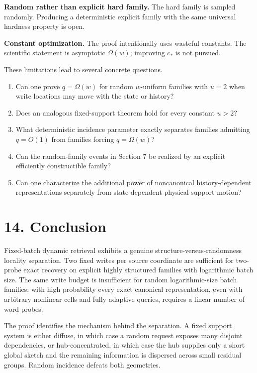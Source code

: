 \documentclass[
]{article}
\providecommand{\tightlist}{%
  \setlength{\itemsep}{0pt}\setlength{\parskip}{0pt}}
\begin{document}
\textbf{Random rather than explicit hard family.} The hard family is
sampled randomly. Producing a deterministic explicit family with the
same universal hardness property is open.

\textbf{Constant optimization.} The proof intentionally uses wasteful
constants. The scientific statement is asymptotic \(\Omega(w)\);
improving \(c_*\) is not pursued.

These limitations lead to several concrete questions.

\begin{enumerate}
\def\labelenumi{\arabic{enumi}.}
\tightlist
\item
  Can one prove \(q=\Omega(w)\) for random \(w\)-uniform families with
  \(u=2\) when write locations may move with the state or history?
\item
  Does an analogous fixed-support theorem hold for every constant
  \(u>2\)?
\item
  What deterministic incidence parameter exactly separates families
  admitting \(q=O(1)\) from families forcing \(q=\Omega(w)\)?
\item
  Can the random-family events in Section 7 be realized by an explicit
  efficiently constructible family?
\item
  Can one characterize the additional power of noncanonical
  history-dependent representations separately from state-dependent
  physical support motion?
\end{enumerate}

\hypertarget{conclusion}{%
\section{14. Conclusion}\label{conclusion}}

Fixed-batch dynamic retrieval exhibits a genuine
structure-versus-randomness locality separation. Two fixed writes per
source coordinate are sufficient for two-probe exact recovery on
explicit highly structured families with logarithmic batch size. The
same write budget is insufficient for random logarithmic-size batch
families: with high probability every exact canonical representation,
even with arbitrary nonlinear cells and fully adaptive queries, requires
a linear number of word probes.

The proof identifies the mechanism behind the separation. A fixed
support system is either diffuse, in which case a random request exposes
many disjoint dependencies, or hub-concentrated, in which case the hub
supplies only a short global sketch and the remaining information is
dispersed across small residual groups. Random incidence defeats both
geometries.
\end{document}
